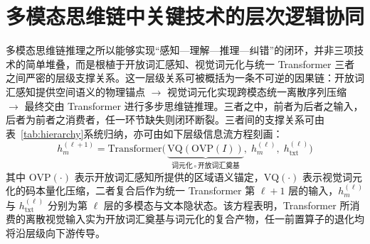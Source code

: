 \documentclass[twocolumn]{ctexart}
\begin{document}
\section{多模态思维链中关键技术的层次逻辑协同}\label{sec:hierarchy}

多模态思维链推理之所以能够实现“感知—理解—推理—纠错”的闭环，并非三项技术的简单堆叠，而是根植于开放词汇感知、视觉词元化与统一 Transformer 三者之间严密的层级支撑关系。这一层级关系可被概括为一条不可逆的因果链：开放词汇感知提供空间语义的物理锚点 $\rightarrow$ 视觉词元化实现跨模态统一离散序列压缩 $\rightarrow$ 最终交由 Transformer 进行多步思维链推理。三者之中，前者为后者之输入，后者为前者之消费者，任一环节缺失则闭环断裂。三者间的支撑关系可由表~\ref{tab:hierarchy}系统归纳，亦可由如下层级信息流方程刻画：
\begin{equation}\label{eq:hierarchy}
h^{(\ell+1)}_{m}=\text{Transformer}\!\bigl(\,\underbrace{\text{VQ}(\text{OVP}(I))}_{\text{词元化}\,\circ\,\text{开放词汇奠基}},\; h^{(\ell)}_{m},\; h^{(\ell)}_{\text{txt}}\bigr)
\end{equation}
其中 $\text{OVP}(\cdot)$ 表示开放词汇感知所提供的区域语义锚定，$\text{VQ}(\cdot)$ 表示视觉词元化的码本量化压缩，二者复合后作为统一 Transformer 第 $\ell+1$ 层的输入，$h^{(\ell)}_{m}$ 与 $h^{(\ell)}_{\text{txt}}$ 分别为第 $\ell$ 层的多模态与文本隐状态。该方程表明，Transformer 所消费的离散视觉输入实为开放词汇奠基与词元化的复合产物，任一前置算子的退化均将沿层级向下游传导。

\begin{table}[htbp]
  \centering
  \caption{三项关键技术的层级支撑关系}\label{tab:hierarchy}
  \footnotesize
\end{table}
\end{document}
